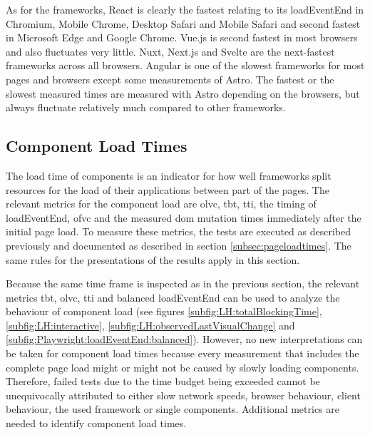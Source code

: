 \documentclass[a4paper, 12pt]{article}
\begin{document}
As for the frameworks, React is clearly the fastest relating to its loadEventEnd in Chromium, Mobile Chrome, Desktop Safari and Mobile Safari and second fastest in Microsoft Edge and Google Chrome.
Vue.js is second fastest in most browsers and also fluctuates very little. Nuxt, Next.js and Svelte are the next-fastest frameworks across all browsers.
Angular is one of the slowest frameworks for most pages and browsers except some measurements of Astro.
The fastest or the slowest measured times are measured with Astro depending on the browsers, but always fluctuate relatively much compared to other frameworks.


\subsection{Component Load Times}\label{subsec:componentloadtimes}

The load time of components is an indicator for how well frameworks split resources for the load of their applications between part of the pages.
The relevant metrics for the component load are \acrfull{olvc}, \acrfull{tbt}, \acrfull{tti}, the timing of loadEventEnd, \acrfull{ofvc} and the measured \acrshort{dom} mutation times immediately after the initial page load.
To measure these metrics, the tests are executed as described previously and documented as described in section \ref{subsec:pageloadtimes}.
The same rules for the presentations of the results apply in this section.

Because the same time frame is inspected as in the previous section, the relevant metrics \acrshort{tbt}, \acrshort{olvc}, \acrshort{tti} and balanced loadEventEnd can be used to analyze the behaviour of component load (see figures \ref{subfig:LH:totalBlockingTime}, \ref{subfig:LH:interactive}, \ref{subfig:LH:observedLastVisualChange} and \ref{subfig:Playwright:loadEventEnd:balanced}).
However, no new interpretations can be taken for component load times because every measurement that includes the complete page load might or might not be caused by slowly loading components.
Therefore, failed tests due to the time budget being exceeded cannot be unequivocally attributed to either slow network speeds, browser behaviour, client behaviour, the used framework or single components.
Additional metrics are needed to identify component load times.
\end{document}
